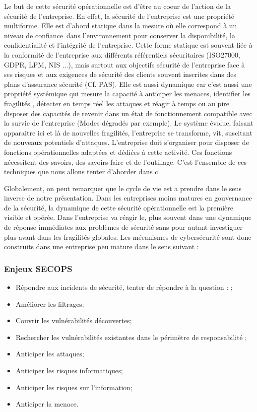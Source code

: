 Le but de cette sécurité opérationnelle est d’être au coeur de l’action de la sécurité de l’entreprise. En effet, la sécurité de l’entreprise est une propriété multiforme. Elle est d’abord statique dans la mesure où elle correspond à un niveau de confiance dans l’environnement pour conserver la disponibilité, la confidentialité et l’intégrité de l’entreprise. Cette forme statique est souvent liée à la conformité de l’entreprise aux différents référentiels sécuritaires (ISO27000, GDPR, LPM, NIS ...), mais surtout aux objectifs sécurité de l'entreprise face à ses risques et aux exigences de sécurité des clients souvent inscrites dans des plans d’assurance sécurité (Cf. PAS). 
Elle est aussi dynamique car c’est aussi une propriété systémique qui mesure la capacité à anticiper les menaces, identifier les fragilités , détecter en temps réel les attaques et réagir à temps ou au pire disposer des capacités de revenir dans un état de fonctionnement compatible avec la survie de l’entreprise (Modes dégradés par exemple).
Le système évolue, faisant apparaitre ici et là de nouvelles fragilités, l’entreprise se transforme, vit, suscitant de nouveaux potentiels d’attaques. L’entreprise doit s’organiser pour disposer de fonctions opérationnelles adaptées et dédiées à cette activité. Ces fonctions nécessitent des savoirs, des savoirs-faire et de l’outillage. C’est l’ensemble de ces techniques que nous allons tenter d’aborder dans c\edoc.

Globalement, on peut remarquer que le cycle de vie est a prendre dans le sens inverse de notre présentation. Dans les entreprises moins matures en gouvernance de la sécurité, la dynamique de cette sécurité opérationnelle est la première visible et opérée. Dans l'entreprise va réagir le, plus souvent dans une dynamique de réponse immédiates aux problèmes de sécurité sans pour autant investiguer plus avant dans les fragilités globales. Les mécanismes de cybersécurité sont donc construits dans une entreprise peu mature dans le sens suivant :

\begin{frame}
\frametitle<presentation>{Enjeux SECOPS}
	\begin{itemize}
		\item Répondre aux incidents de sécurité, tenter de répondre à la question : ; 
		\item Améliorer les filtrages;
		\item Couvrir les vulnérabilités découvertes;
		\item Rechercher les vulnérabilités existantes dans le périmètre de responsabilité ;
		\item Anticiper les attaques;
		\item Anticiper les risques informatiques;
		\item Anticiper les risques sur l'information;
		\item Anticiper la menace.
	\end{itemize}
\end{frame}

